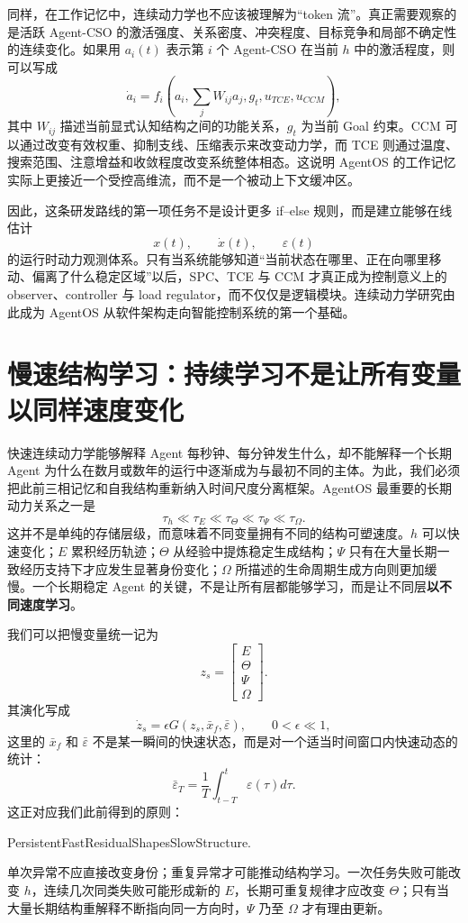 同样，在工作记忆中，连续动力学也不应该被理解为``token 流''。真正需要观察的是活跃 Agent-CSO 的激活强度、关系密度、冲突程度、目标竞争和局部不确定性的连续变化。如果用 $a_i(t)$ 表示第 $i$ 个 Agent-CSO 在当前 $h$ 中的激活程度，则可以写成
\[
\dot a_i
=
f_i
\left(
a_i,
\sum_j W_{ij}a_j,
g_t,
u_{TCE},
u_{CCM}
\right),
\]
其中 $W_{ij}$ 描述当前显式认知结构之间的功能关系，$g_t$ 为当前 Goal 约束。CCM 可以通过改变有效权重、抑制支线、压缩表示来改变动力学，而 TCE 则通过温度、搜索范围、注意增益和收敛程度改变系统整体相态。这说明 AgentOS 的工作记忆实际上更接近一个受控高维流，而不是一个被动上下文缓冲区。

因此，这条研发路线的第一项任务不是设计更多 if--else 规则，而是建立能够在线估计
\[
x(t),\qquad
\dot{x}(t),\qquad
\varepsilon(t)
\]
的运行时动力观测体系。只有当系统能够知道``当前状态在哪里、正在向哪里移动、偏离了什么稳定区域''以后，SPC、TCE 与 CCM 才真正成为控制意义上的 observer、controller 与 load regulator，而不仅仅是逻辑模块。连续动力学研究由此成为 AgentOS 从软件架构走向智能控制系统的第一个基础。

\section{慢速结构学习：持续学习不是让所有变量以同样速度变化}

快速连续动力学能够解释 Agent 每秒钟、每分钟发生什么，却不能解释一个长期 Agent 为什么在数月或数年的运行中逐渐成为与最初不同的主体。为此，我们必须把此前三相记忆和自我结构重新纳入时间尺度分离框架。AgentOS 最重要的长期动力关系之一是
\[
\tau_h
\ll
\tau_E
\ll
\tau_\Theta
\ll
\tau_\Psi
\ll
\tau_\Omega.
\]
这并不是单纯的存储层级，而意味着不同变量拥有不同的结构可塑速度。$h$ 可以快速变化；$E$ 累积经历轨迹；$\Theta$ 从经验中提炼稳定生成结构；$\Psi$ 只有在大量长期一致经历支持下才应发生显著身份变化；$\Omega$ 所描述的生命周期生成方向则更加缓慢。一个长期稳定 Agent 的关键，不是让所有层都能够学习，而是让不同层\textbf{以不同速度学习}。

我们可以把慢变量统一记为
\[
z_s
=
\begin{bmatrix}
E\\
\Theta\\
\Psi\\
\Omega
\end{bmatrix}.
\]
其演化写成
\[
\dot z_s
=
\epsilon
G(z_s,\bar{x}_f,\bar{\varepsilon}),
\qquad
0<\epsilon\ll1,
\]
这里的 $\bar{x}_f$ 和 $\bar{\varepsilon}$ 不是某一瞬间的快速状态，而是对一个适当时间窗口内快速动态的统计：
\[
\bar{\varepsilon}_T
=
\frac{1}{T}
\int_{t-T}^{t}
\varepsilon(\tau)d\tau.
\]
这正对应我们此前得到的原则：
\begin{statementbox}
PersistentFastResidualShapesSlowStructure.
\end{statementbox}
单次异常不应直接改变身份；重复异常才可能推动结构学习。一次任务失败可能改变 $h$，连续几次同类失败可能形成新的 $E$，长期可重复规律才应改变 $\Theta$；只有当大量长期结构重解释不断指向同一方向时，$\Psi$ 乃至 $\Omega$ 才有理由更新。

